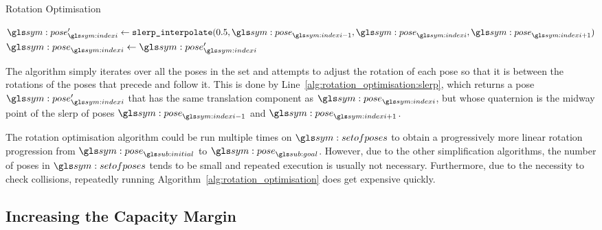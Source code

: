 		\begin{algorithm}[ht]
			\caption{Rotation Optimisation}
			\label{alg:rotation_optimisation}
			\begin{algorithmic}[1]
					\ForAll{$%
						\pose_{\indexi} \in
							\setofposes\setminus
								(\pose_{\initial}, \pose_{\goal})
					$}
						\State{}%
							$
								\pose_{\indexi}' \gets
									\code{slerp\_interpolate}
									(
										0.5,
										\pose_{\indexi - 1},
										\pose_{\indexi},
										\pose_{\indexi + 1}
									)
							$
							\label{alg:rotation_optimisation:slerp}
								\State{}%
									$
										\pose_{\indexi} \gets \pose_{\indexi}'
									$
							\EndIf{}
						\EndIf{}
					\EndFor{}
				\EndProcedure{}
			\end{algorithmic}
		\end{algorithm}

		The algorithm simply iterates over all the poses in the set and attempts
		to adjust the rotation of each pose so that it is between the rotations
		of the poses that precede and follow it. This is done by
		Line~\ref{alg:rotation_optimisation:slerp}, which returns a pose
		$\pose_{\indexi}'$ that has the same translation component as
		$\pose_{\indexi}$, but whose quaternion is the midway point of the
		\gls{slerp} of poses $\pose_{\indexi - 1}$ and $\pose_{\indexi + 1}$.

		The rotation optimisation algorithm could be run multiple times on
		$\setofposes$ to obtain a progressively more linear rotation progression
		from $\pose_{\initial}$ to $\pose_{\goal}$. However, due to the other
		simplification algorithms, the number of poses in $\setofposes$ tends to
		be small and repeated execution is usually not necessary. Furthermore,
		due to the necessity to check collisions, repeatedly running
		Algorithm~\ref{alg:rotation_optimisation} does get expensive quickly.

	\subsection{Increasing the Capacity Margin}%
	\label{sec:increasing_the_capacity_margin}

